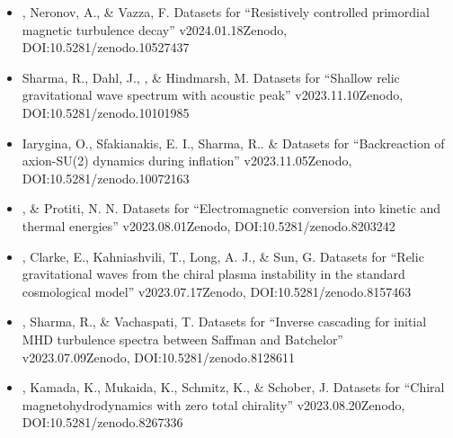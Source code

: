 \begin{itemize}
\item[{49.}~]
\Brandenburg, Neronov, A., \& Vazza, F.
{Datasets for ``Resistively controlled primordial magnetic turbulence decay'' v2024.01.18}{Zenodo, DOI:10.5281/zenodo.10527437}

\item[{48.}~]
Sharma, R., Dahl, J., \Brandenburg, \& Hindmarsh, M.
{Datasets for ``Shallow relic gravitational wave spectrum with acoustic peak'' v2023.11.10}{Zenodo, DOI:10.5281/zenodo.10101985}

\item[{47.}~]
Iarygina, O., Sfakianakis, E. I., Sharma, R.. \& \Brandenburg{}
{Datasets for ``Backreaction of axion-SU(2) dynamics during inflation'' v2023.11.05}{Zenodo, DOI:10.5281/zenodo.10072163}

\item[{46.}~]
\Brandenburg, \& Protiti, N. N.
{Datasets for ``Electromagnetic conversion into kinetic and thermal energies'' v2023.08.01}{Zenodo, DOI:10.5281/zenodo.8203242}

\item[{45.}~]
\Brandenburg, Clarke, E., Kahniashvili, T., Long, A. J., \& Sun, G.
{Datasets for ``Relic gravitational waves from the chiral plasma instability in the standard cosmological model'' v2023.07.17}{Zenodo, DOI:10.5281/zenodo.8157463}

\item[{44.}~]
\Brandenburg, Sharma, R., \& Vachaspati, T.
{Datasets for ``Inverse cascading for initial MHD turbulence spectra between Saffman and Batchelor'' v2023.07.09}{Zenodo, DOI:10.5281/zenodo.8128611}

\item[{43.}~]
\Brandenburg, Kamada, K., Mukaida, K., Schmitz, K., \& Schober, J.
{Datasets for ``Chiral magnetohydrodynamics with zero total chirality'' v2023.08.20}{Zenodo, DOI:10.5281/zenodo.8267336}


\end{itemize}
